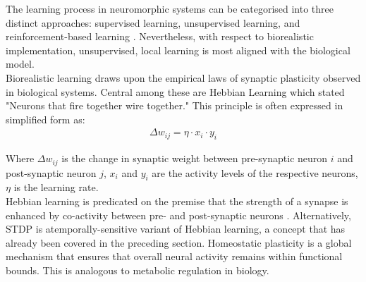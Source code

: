 




\noindent The learning process in neuromorphic systems can be categorised into three distinct approaches: supervised learning, unsupervised learning, and reinforcement-based learning \cite{stone2019artificial}. Nevertheless, with respect to biorealistic implementation, unsupervised, local learning is most aligned with the biological model. \\

\noindent Biorealistic learning draws upon the empirical laws of synaptic plasticity observed in biological systems. Central among these are Hebbian Learning \cite{kempter1999hebbian} which stated "Neurons that fire together wire together." This principle is often expressed in simplified form as:\\
\begin{align}
    \Delta w_{ij} = \eta \cdot x_i \cdot y_i \label{eq:2.31}
\end{align}

\noindent Where $\Delta w_{ij}$ is the change in synaptic weight between pre-synaptic neuron $i$ and post-synaptic neuron $j$, $x_i$ and $y_i$ are the activity levels of the respective neurons, $\eta$ is the learning rate. \\

\noindent Hebbian learning is predicated on the premise that the strength of a synapse is enhanced by co-activity between pre- and post-synaptic neurons \cite{frenkel2019morphic}. Alternatively, STDP is atemporally-sensitive variant of Hebbian learning, a concept that has already been covered in the preceding section. Homeostatic plasticity is a global mechanism that ensures that overall neural activity remains within functional bounds. This is analogous to metabolic regulation in biology.\\

